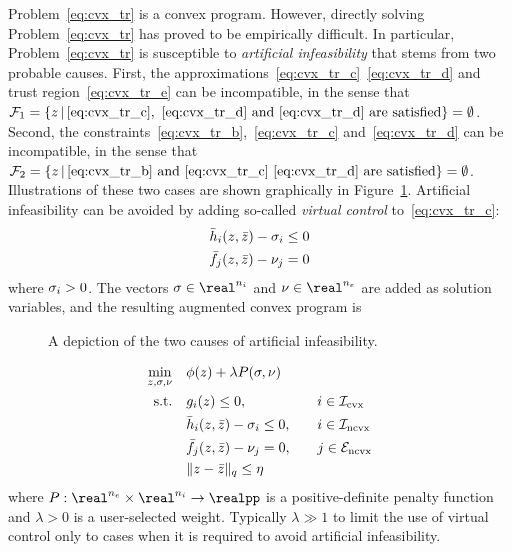 \documentclass[letterpaper, 10 pt, conference]{ieeeconf}
\begin{document}
Problem~\eqref{eq:cvx_tr} is a convex program. However, directly solving Problem~\eqref{eq:cvx_tr} has proved to be empirically difficult. In particular, Problem~\eqref{eq:cvx_tr} is susceptible to \textit{artificial infeasibility} that stems from two probable causes. First, the approximations~\eqref{eq:cvx_tr_c}~\eqref{eq:cvx_tr_d} and trust region~\eqref{eq:cvx_tr_e} can be incompatible, in the sense that $\mathcal{F}_1 = \{z\,|\,\eqref{eq:cvx_tr_c},~\eqref{eq:cvx_tr_d}\text{ and }\eqref{eq:cvx_tr_d}\text{ are satisfied}\} = \emptyset$. 
Second, the constraints~\eqref{eq:cvx_tr_b},~\eqref{eq:cvx_tr_c} and~\eqref{eq:cvx_tr_d} can be incompatible, in the sense that $\mathcal{F}_2 = \{z\,|\,\eqref{eq:cvx_tr_b}\text{ and }\eqref{eq:cvx_tr_c}~\eqref{eq:cvx_tr_d}\text{ are satisfied}\}=\emptyset$. Illustrations of these two cases are shown graphically in Figure~\ref{fig:artificial_infeas}. Artificial infeasibility can be avoided by adding so-called \textit{virtual control} to~\eqref{eq:cvx_tr_c}:
\begin{subequations}\label{eq:virtual_control}
\begin{align}
\bar{h}_i(z,\bar{z}) - \sigma_i \leq 0 \\
\bar{f}_j(z,\bar{z}) - \nu_j = 0
\end{align}
\end{subequations}
where $\sigma_i > 0$. The vectors $\vcc\in\real^{n_i}$ and $\vc\in\real^{n_e}$ are added as solution variables, and the resulting augmented convex program is%
\begin{figure}
\centering
\subfloat[$\mathcal{F}_1 = \emptyset$.]{} \hfil
\subfloat[$\mathcal{F}_2 = \emptyset$]{}
\caption{A depiction of the two causes of artificial infeasibility.}
\label{fig:artificial_infeas}
\end{figure}
\begin{subequations}\label{eq:cvx_apprx}
\begin{align}
\min_{\z,\vcc,\vc} &\quad \ocost(\z) + \lambda P(\vcc,\vc) &&\null \label{eq:cvx_apprx_a} \\
\text{s.t.} &\quad \fc_i(\z) \leq 0, &&\quad i\in\setIcvx \label{eq:cvx_apprx_b} \\
&\quad \fnib_i(\z,\zb) - \vcc_i \leq 0, &&\quad i\in\setIncvx \label{eq:cvx_apprx_c}\\
&\quad \fneb_j(\z,\zb) - \vc_j = 0, &&\quad j\in\setEncvx \label{eq:cvx_apprx_d} \\
&\quad \|\z-\zb\|_q \leq \tr &&\null  \label{eq:cvx_apprx_e}
\end{align}
\end{subequations}
where $P : \real^{n_e}\times\real^{n_i} \rightarrow \realpp$ is a positive-definite penalty function and $\lambda>0$ is a user-selected weight. Typically $\lambda \gg 1$ to limit the use of virtual control only to cases when it is required to avoid artificial infeasibility.
\end{document}
